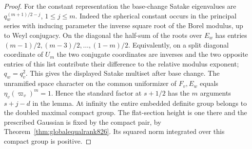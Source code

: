 \documentclass[a4paper,11pt]{article}
\theoremstyle{definition}
\theoremstyle{remark}
\numberwithin{equation}{section}
\begin{document}
\begin{proof}
For the constant representation the base-change Satake
eigenvalues are \(q_w^{(m+1)/2-j}\), \(1\le j\le m\).
Indeed the spherical constant occurs in the principal series
with inducing parameter the inverse square root of the
Borel modulus, up to Weyl conjugacy. On the diagonal the
half-sum of the roots over \(E_w\) has entries
\((m-1)/2,(m-3)/2,\ldots,(1-m)/2\). Equivalently, on a
split diagonal coordinate of \(U_m\) the two conjugate
coordinates are inverses and the two opposite entries of
this list contribute their difference to the relative
modulus exponent; \(q_w=q_v^2\). This gives the displayed
Satake multiset after base change. The unramified space
character on the common uniformizer of \(F_v,E_w\) equals
\(\eta_v(\varpi_v)^m=1\). Hence the standard factor at
\(s+1/2\) has the \(m\) arguments \(s+j-d\) in the lemma.
At infinity the entire embedded definite group belongs to
the doubled maximal compact group. The flat-section height is
one there and the prescribed Gaussian is fixed by the compact
pair, by Theorem~\ref{thm:globalequalrank826}. Its squared
norm integrated over this compact group is positive.
\end{proof}
\end{document}
